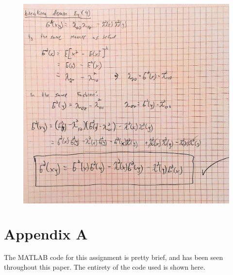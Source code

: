 \documentclass[]{article}
\begin{document}
\begin{figure}[hbtp]
	\noindent \includegraphics[scale=0.25]{Problem3Page2.jpg}
\end{figure}

\vspace{8in}

\section{Appendix A}
The MATLAB code for this assignment is pretty brief, and has been seen throughout this paper. The entirety of the code used is shown here. 
\end{document}
